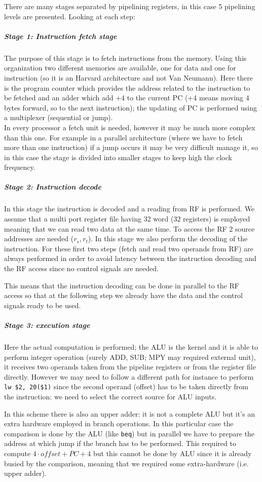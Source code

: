 There are many stages separated by pipelining registers, in this case 5 pipelining levels are presented. Looking at each step:

\subparagraph{Stage 1: Instruction fetch stage}
The purpose of this stage is to fetch instructions from the memory. Using this organization two different memories are available, one for data and one for instruction (so it is an Harvard architecture and not Van Neumann). Here there is the program counter which provides the address related to the instruction to be fetched and an adder which add +4 to the current PC (+4 means moving 4 bytes forward, so to the next instruction); the updating of PC is performed using a multiplexer (sequential or jump).\\
In every processor a fetch unit is needed, however it may be much more complex than this one. For example in a parallel architecture (where we have to fetch more than one instruction) if a jump occurs it may be very difficult manage it, so in this case the stage is divided into smaller stages to keep high the clock frequency.

\subparagraph{Stage 2: Instruction decode}
In this stage the instruction is decoded and a reading from RF is performed. We assume that a multi port register file having 32 word (32 registers) is employed meaning that we can read two data at the same time. To access the RF 2 source addresses are needed ($r_s, r_t$). In this stage we also perform the decoding of the instruction. For these first two steps (fetch and read two operands from RF) are always performed in order to avoid latency between the instruction decoding and the RF access since no control signals are needed.

This means that the instruction decoding can be done in parallel to the RF access so that at the following step we already have the data and the control signals ready to be used.

\subparagraph{Stage 3: execution stage}
Here the actual computation is performed; the ALU is the kernel and it is able to perform integer operation (surely ADD, SUB; MPY may required external unit), it receives two operands taken from the pipeline registers or from the register file directly. However we may need to follow a different path for instance to perform \verb|lw $2, 20($1)| since the second operand (offset) has to be taken directly from the instruction: we need to select the correct source for ALU inputs.

In this scheme there is also an upper adder: it is not a complete ALU but it's an extra hardware employed in branch operations. In this particular case the comparison is done by the ALU (like \verb|beq|) but in parallel we have to prepare the address at which jump if the branch has to be performed. This required to compute $4 \cdot offset + PC+4$ but this cannot be done by ALU since it is already busied by the comparison, meaning that we required some extra-hardware (i.e. upper adder).

